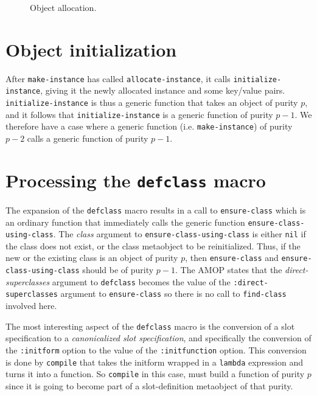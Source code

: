 \begin{figure}
\begin{center}
\end{center}
\caption{\label{fig-make-instance}
Object allocation.}
\end{figure}

\section{Object initialization}

After \texttt{make-instance} has called \texttt{allocate-instance}, it
calls \texttt{initialize-instance}, giving it the newly allocated
instance and some key/value pairs.  \texttt{initialize-instance} is
thus a generic function that takes an object of purity $p$, and it
follows that \texttt{initialize-instance} is a generic function of
purity $p-1$.  We therefore have a case where a generic function
(i.e. \texttt{make-instance}) of purity $p-2$ calls a generic function
of purity $p-1$.

\section{Processing the \texttt{defclass} macro}

The expansion of the \texttt{defclass} macro results in a call to
\texttt{ensure-class} which is an ordinary function that immediately
calls the generic function \texttt{ensure-class-using-class}.  The
\textit{class} argument to \texttt{ensure-class-using-class} is either
\texttt{nil} if the class does not exist, or the class metaobject to
be reinitialized.  Thus, if the new or the existing class is an object
of purity $p$, then \texttt{ensure-class} and
\texttt{ensure-class-using-class} should be of purity $p-1$.
The AMOP states that the \emph{direct-superclasses} argument to
\texttt{defclass} becomes the value of the
\texttt{:direct-superclasses} argument to \texttt{ensure-class} so
there is no call to \texttt{find-class} involved here.

The most interesting aspect of the \texttt{defclass} macro is the
conversion of a slot specification to a \emph{canonicalized slot
  specification}, and specifically the conversion of the
\texttt{:initform} option to the value of the \texttt{:initfunction}
option.  This conversion is done by \texttt{compile} that takes the
initform wrapped in a \texttt{lambda} expression and turns it into a
function.  So \texttt{compile} in this case, must build a function of
purity $p$ since it is going to become part of a slot-definition
metaobject of that purity.

